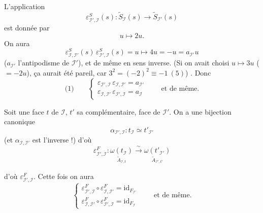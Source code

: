\documentclass[11pt,a4paper]{article}
\begin{document}
L'application 
\[
\varepsilon^S_{\mathcal I',\mathcal I}(s) : \widetilde S_{\mathcal I}(s) \longrightarrow \widetilde S_{\mathcal I'}(s)
\]
est donnée par
\[
u \longmapsto 2u .
\]
On aura
\[
\varepsilon^S_{\mathcal I,\mathcal I'}(s)\,\varepsilon^S_{\mathcal I',\mathcal I}(s) = u\longmapsto 4u = -u = a_{\mathcal I'}u
\]
($a_{\mathcal I'}$ l'antipodisme de $\mathcal I'$), et de même en sens inverse. (Si on avait choisi $u\mapsto 3u$ ($=-2u$), ça aurait été pareil, car $3^2 = (-2)^2 \equiv -1\ (5)$) . Donc
\[
\text{(1)}\qquad
\begin{cases}
\varepsilon_{\mathcal I',\mathcal I}\,\varepsilon_{\mathcal I,\mathcal I'} = a_{\mathcal I'}\\
\varepsilon_{\mathcal I,\mathcal I'}\,\varepsilon_{\mathcal I',\mathcal I} = a_{\mathcal I}
\end{cases}
\qquad\text{et de même.}
\]

Soit une face $t$ de $\mathcal I$, $t'$ sa complémentaire, face de $\mathcal I'$. On a une bijection canonique
\[
\alpha_{\mathcal I',\mathcal I} : t_{\mathcal I} \simeq t'_{\mathcal I'}
\]
(et $\alpha_{\mathcal I,\mathcal I'}$ est l'inverse !) d'où
\[
\varepsilon^F_{\mathcal I',\mathcal I} : \underset{\textstyle\widetilde A_{\mathcal I,t}}{\omega(t_{\mathcal I})} \xrightarrow{\ \sim\ } \underset{\textstyle\widetilde A_{\mathcal I',t'}}{\omega(t'_{\mathcal I'})}
\]

d'où $\varepsilon^F_{\mathcal I',\mathcal I}$. Cette fois on aura
\[
\begin{cases}
\varepsilon^F_{\mathcal I',\mathcal I}\circ\varepsilon^F_{\mathcal I,\mathcal I'} = \mathrm{id}_{F_{\mathcal I'}}\\
\varepsilon^F_{\mathcal I,\mathcal I'}\circ\varepsilon^F_{\mathcal I',\mathcal I} = \mathrm{id}_{F_{\mathcal I}}
\end{cases}
\qquad\text{et de même.}
\]
\end{document}
